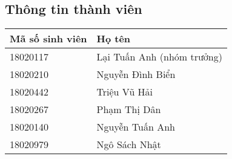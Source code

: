 \documentclass[./../main.tex]{subfiles}
\begin{document}
\subsection{Thông tin thành viên}
\begin{table}[H]
\begin{tabular}{|p{}|p{}|}
\hline
\textbf{Mã số sinh viên} & \textbf{Họ tên}             \\ \hline
18020117                 & Lại Tuấn Anh (nhóm  trưởng) \\ \hline
18020210                 & Nguyễn Đình Biển            \\ \hline
18020442                 & Triệu Vũ Hải                \\ \hline
18020267                 & Phạm Thị Dân                \\ \hline
18020140                 & Nguyễn Tuấn Anh             \\ \hline
18020979                 & Ngô Sách Nhật               \\ \hline
\end{tabular}
\end{table}
\end{document}
